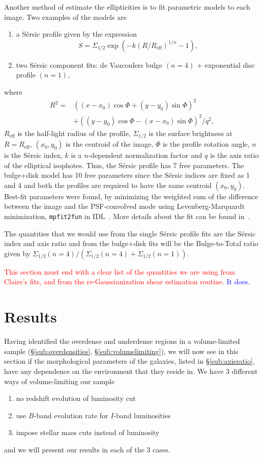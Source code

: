 \documentclass[twocolumn,useAMS,usenatbib]{mn2e}
\newcommand{\rachel}[1]{{\textcolor{red}{#1}}}
\newcommand{\arun}[1]{{\textcolor{blue}{#1}}}
\newcommand{\sersic}{S\'{e}rsic }
\newcommand{\btt}{Bulge-to-Total }
\begin{document}
Another method of estimate the ellipticities is to fit parametric models to each image. Two examples of the models are
\begin{enumerate}
 \item a \sersic profile given by the expression 
       \begin{equation} 
    S = \Sigma_{1/2}\exp{\left( -k(R/R_{\text{eff}})^{1/n} -1 \right)},
       \end{equation}
       \item two \sersic component fits: de Vaucoulers bulge $(n=4)$ + exponential disc profile $(n=1)$,
\end{enumerate}
where \begin{align*} R^2 = & ((x-x_0)\cos\Phi+(y-y_0)\sin\Phi)^2  \\ & + ((y-y_0)\cos\Phi-(x-x_0)\sin\Phi)^2/q^2, \end{align*}
$R_{\text{eff}}$ is the half-light radius of the profile, $\Sigma_{1/2}$ is the surface brightness at $R=R_{\text{eff}}$, $(x_0,y_0)$ is the centroid of the image,
$\Phi$ is the profile rotation angle, $n$ is the \sersic index, $k$ is a $n$-dependent normalization factor and $q$ is the axis ratio of the elliptical isophotes.
Thus, the \sersic profile has 7 free parameters. The bulge+disk model has 10 free parameters since the \sersic indices are fixed as 1 and 4
and both the profiles are required to have the same centroid $(x_0,y_0)$. Best-fit parameters were found, by minimizing the weighted
sum of the difference between the image and the PSF-convolved mode
using Levenberg-Marquardt minimization, \texttt{mpfit2fun} in IDL~\citep{mpfit2fun}. More details about the fit can be found
in~\cite{Claire_Fits}.

The quantities that we would use from the single \sersic profile fits are the \sersic index and axis ratio
and from the bulge+disk fits will be the \btt ratio given by ${\Sigma_{1/2}(n=4)}/{\left(\Sigma_{1/2}(n=4)+\Sigma_{1/2}(n=1)\right)}$.


\rachel{This section must end with a clear list of the quantities we
  are using from Claire's fits, and from the re-Gaussianization shear
  estimation routine.} \arun{It does.}

\section{Results}
\label{S:results}
Having identified the overdense and underdense regions in a volume-limited sample (\S\ref{sub:overdensities}, \S\ref{sub:volumelimiting}), we will now see in this section if the morphological
parameters of the galaxies, listed in \S\ref{sub:axisratio}, have any dependence on the environment that they reside in. We have 3 different ways of volume-limiting our sample
\begin{enumerate}
 \item no redshift evolution of luminosity cut
 \item use $B$-band evolution rate for $I$-band luminosities
 \item impose stellar mass cuts instead of luminosity
\end{enumerate}
and we will present our results in each of the 3 cases. 
\end{document}
